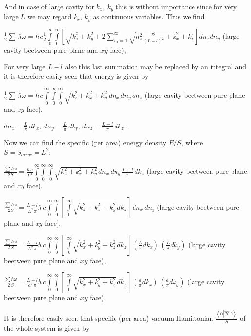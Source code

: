 \documentclass[11pt]{article}
\begin{document}
    And in case of large cavity for \(k_x\), \(k_y\) this is without
importance since for very large \(L\) we may regard \(k_x\), \(k_y\) as
continuous variables. Thus we find

\(\frac{1}{2}\sum\,\hbar\omega = \hbar\,c\frac{1}{2}\int\limits_{0}^{\infty}\int\limits_{0}^{\infty}\left[{\sqrt{k_x^2+k_y^2}+2\sum\limits_{n_z=1}^{\infty}\sqrt{n_z^2\frac{\pi^2}{(L-l)^2}+k_x^2+k_y^2}}\right]d{n_x}d{n_y}\)
(large cavity beetween pure plane and \(xy\) face),

For very large \(L-l\) also this last summation may be replaced by an
integral and it is therefore easily seen that energy is given by

\(\frac{1}{2}\sum\,\hbar\omega = \hbar\,c\int\limits_{0}^{\infty}\int\limits_{0}^{\infty}\int\limits_{0}^{\infty}\sqrt{k_z^2+k_x^2+k_y^2}\,d{n_x}\,d{n_y}\,d{n_z}\)
(large cavity beetween pure plane and \(xy\) face),

\(dn_x = \frac{L}{\pi}\,dk_x\), \(dn_y = \frac{L}{\pi}\,dk_y\),
\(dn_z = \frac{L-l}{\pi}\,dk_z\).

    Now we can find the specific (per area) energy density \(E/S\), where
\(S = S_{large} = L^2\):

\(\frac{\sum\hbar\omega}{2 S} = \frac{\hbar\,c}{L^2}\int\limits_{0}^{\infty}\int\limits_{0}^{\infty}\int\limits_{0}^{\infty}\sqrt{k_z^2+k_x^2+k_y^2}\,dn_x\,dn_y\,\frac{L-l}{\pi}\,dk_z\)
(large cavity beetween pure plane and \(xy\) face),

\(\frac{\sum\hbar\omega}{2 S} = \frac{L-l}{L^2\,\pi}\hbar\,c\int\limits_{0}^{\infty}\int\limits_{0}^{\infty}\left[\,\int\limits_{0}^{\infty}\sqrt{k_z^2+k_x^2+k_y^2}\,dk_z\right]\,dn_x\,dn_y\)
(large cavity beetween pure plane and \(xy\) face),

\(\frac{\sum\hbar\omega}{2\,S} = \frac{L-l}{L^2\,\pi}\hbar\,c\int\limits_{0}^{\infty}\int\limits_{0}^{\infty}\left[\,\int\limits_{0}^{\infty}\sqrt{k_x^2+k_y^2+k_z^2}\,dk_z\right]\,\left(\frac{L}{\pi}dk_x\right)\,\left(\frac{L}{\pi}dk_y\right)\)
(large cavity beetween pure plane and \(xy\) face),

\(\frac{\sum\hbar\omega}{2\,S} = \frac{L-l}{a^2\,\pi}\hbar\,c\int\limits_{0}^{\infty}\int\limits_{0}^{\infty}\left[\,\int\limits_{0}^{\infty}\sqrt{k_x^2+k_y^2+k_z^2}\,dk_z\right]\,\left(\frac{a}{\pi}dk_x\right)\,\left(\frac{a}{\pi}dk_y\right)\)
(large cavity beetween pure plane and \(xy\) face).

    It is therefore easily seen that specific (per area) vacuum Hamiltonian
\(\frac{\left<0|\hat{\mathcal{H}}|0\right>}{S}\) of the whole system is
given by
\end{document}
